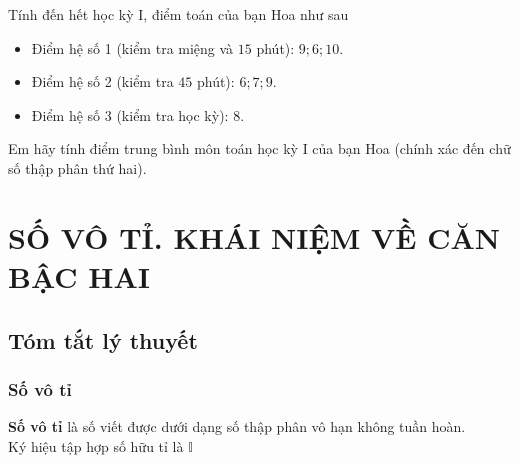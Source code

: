 \begin{bt}%
Tính đến hết học kỳ I, điểm toán của bạn Hoa như sau
\begin{itemize}
	\item Điểm hệ số 1 (kiểm tra miệng và $ 15 $ phút): $ 9;6;10 $.
	\item Điểm hệ số 2 (kiểm tra $ 45 $ phút): $ 6;7;9 $.
	\item Điểm hệ số 3 (kiểm tra học kỳ): $ 8 $.
\end{itemize}
Em hãy tính điểm trung bình môn toán học kỳ I của bạn Hoa (chính xác đến chữ số thập phân thứ hai).
\end{bt}

\section{SỐ VÔ TỈ. KHÁI NIỆM VỀ CĂN BẬC HAI}
\subsection{Tóm tắt lý thuyết}
\subsubsection{Số vô tỉ}
\begin{dn}
	\textbf{Số vô tỉ} là số viết được dưới dạng số thập phân vô hạn không tuần hoàn. \\
	Ký hiệu tập hợp số hữu tỉ là $ \mathbb{I} $
\end{dn}
